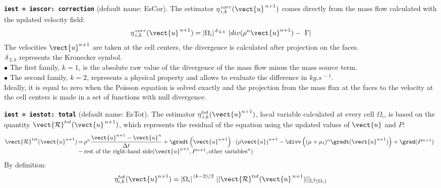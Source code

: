 {\tt \bf iest = iescor: correction}  (default name: EsCor).
The estimator $ \eta^{\,corr}_{\,i,k}(\vect{u}^{\,n+1})$ comes directly
from the mass flow calculated with the updated velocity field:
\begin{eqnarray*}
            \eta^{\,corr}_{\,i,k}(\vect{u}^{\,n+1})=
|\Omega_i|^{\,\delta_{\,2,k}}\ |div (\rho^n \vect{u}^{n+1}) -\ \Gamma|
\end{eqnarray*}
The velocities $\vect{u}^{n+1}$ are taken at the cell centers,
the divergence is calculated after projection on the faces.\\
            $ \,\delta_{\,2,k}$ represents the Kronecker symbol.\\
\hspace*{0.5cm}$\bullet$ The first family, $k=1$, is the absolute raw
value of the divergence of the mass flow minus the mass source term.\\
\hspace*{0.5cm}$\bullet$ The second family, $k=2$, represents a physical
property and allows to evaluate the difference in $kg.s^{\,-1}$.\\
Ideally, it is equal to zero when the Poisson equation is solved exactly and
the projection from the mass flux at the faces to the velocity at the cell
centers is made in a set of  functions with null divergence.

{\tt \bf iest = iestot: total} (default name: EsTot).
The estimator $ \eta^{tot}_{\,i,k}(\vect{u}^{n+1})$, local variable
calculated at every cell $\Omega_i$, is based on the quantity
$\vect{\mathcal R}^{tot}(\vect{u}^{\,n+1})$, which represents the
residual of the equation using the updated values of
$\vect{u}$ and $P$:
\begin{equation*}
\begin{array}{@{}r@{\,} c@{\,} l}
\vect{\mathcal{R}}^{tot}({\vect{u}^{n+1}})&= & \rho^n
    \dfrac{{\vect{u}^{n+1}}-\vect{u}^n}{\Delta t}
  + \gradt \left({\vect{u}^{n+1}} \right) \cdot {\left(\rho  \vect{u}\right)}^{n+1}
              - \divv \left((\mu+\mu_t)^n \gradt({\vect{u}^{n+1}}) \right)
              + \grad({P^{n+1}})     \\
              &- &\text{rest of the right-hand side}
                        ({\vect{u}^{n+1}}, {P^{n+1}}, \text{other variables}^n)
\end{array}
\end{equation*}
%
By definition:
$$ \eta^{tot}_{i,k}(\vect{u}^{n+1})= {|\Omega_i|}^{\,(k-2)/2}\ ||\vect{\mathcal R}^{tot}(\vect{u}^{\,n+1})||
_{\mathbb{L}^{2}(\Omega_i)}$$

